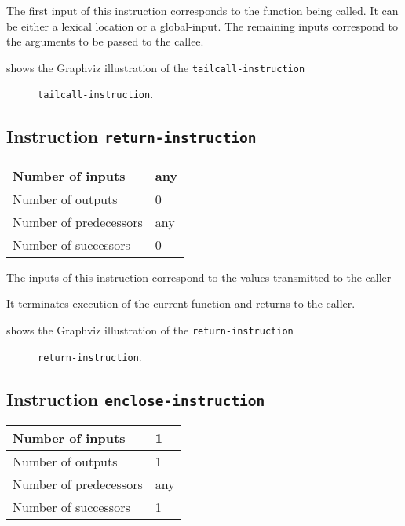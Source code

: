 The first input of this instruction corresponds to the function being
called.  It can be either a lexical location or a global-input.  
The remaining inputs correspond to the arguments to be passed to the
callee. 

 shows the Graphviz illustration of the
\texttt{tailcall-instruction}

\begin{figure}
\begin{center}
\end{center}
\caption{\label{fig-tailcall-instruction}
\texttt{tailcall-instruction}.}
\end{figure}

\subsection{Instruction \texttt{return-instruction}}
\label{mir-instruction-return}

\begin{tabular}{|l|l|}
\hline
Number of inputs & any\\
\hline
Number of outputs & 0\\
\hline
Number of predecessors & any\\
\hline
Number of successors & 0\\
\hline
\end{tabular}

The inputs of this instruction correspond to the values transmitted to
the caller

It terminates execution of the current function and returns to the
caller. 

 shows the Graphviz illustration of the
\texttt{return-instruction}

\begin{figure}
\begin{center}
\end{center}
\caption{\label{fig-return-instruction}
\texttt{return-instruction}.}
\end{figure}

\subsection{Instruction \texttt{enclose-instruction}}
\label{mir-instruction-enclose}

\begin{tabular}{|l|l|}
\hline
Number of inputs & 1\\
\hline
Number of outputs & 1\\
\hline
Number of predecessors & any\\
\hline
Number of successors & 1\\
\hline
\end{tabular}

